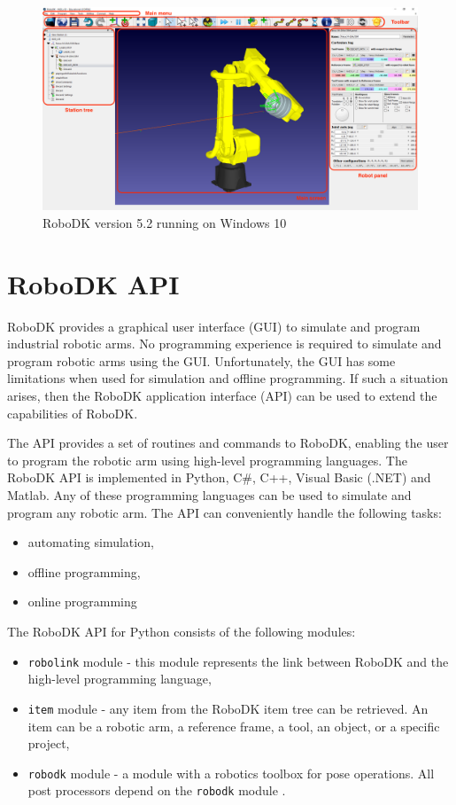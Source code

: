 \begin{figure}[h]
    \centering
    \includegraphics[width=0.9\linewidth]{img/robodk_interface_v_2.png}
    \caption{RoboDK version 5.2 running on Windows 10}
    \label{fig:robodkinterface}
\end{figure}

\section{RoboDK API}

RoboDK provides a graphical user interface (GUI) to simulate and program industrial robotic arms. No programming experience is required to simulate and program robotic arms using the GUI. Unfortunately, the GUI has some limitations when used for simulation and offline programming. If such a situation arises, then the RoboDK application interface (API) can be used to extend the capabilities of RoboDK.

The API provides a set of routines and commands to RoboDK, enabling the user to program the robotic arm using high-level programming languages. The RoboDK API is implemented in Python, C\#, C++, Visual Basic (.NET) and Matlab. Any of these programming languages can be used to simulate and program any robotic arm. The API can conveniently handle the following tasks:

\begin{itemize}
    \item automating simulation,
    \item offline programming,
    \item online programming
\end{itemize}

The RoboDK API for Python consists of the following modules:


\begin{itemize}
    \item \texttt{robolink} module - this module represents the link between RoboDK and the high-level programming language,
    \item \texttt{item} module - any item from the RoboDK item tree can be retrieved.  An item can be a robotic arm, a reference frame, a tool, an object, or a specific project,
    \item \texttt{robodk} module - a module with a robotics toolbox for pose operations. All post processors depend on the \texttt{robodk} module \cite{robodkapi}.
\end{itemize}

